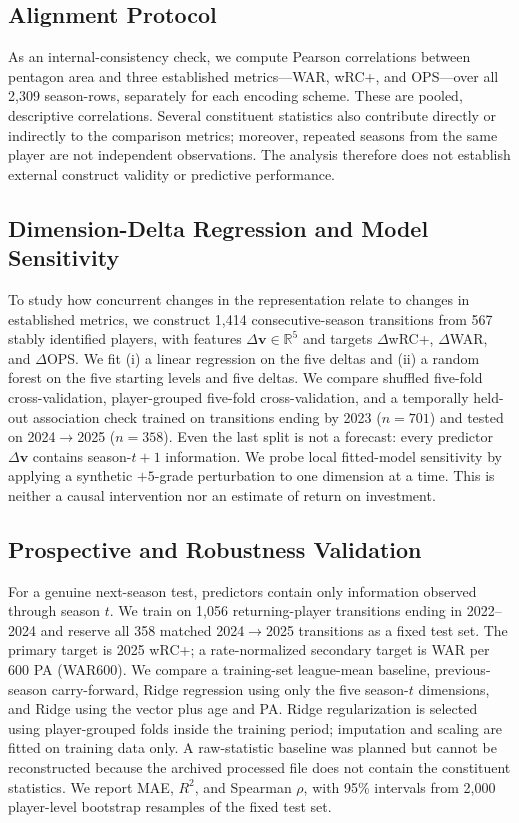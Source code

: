 \documentclass[10pt,twocolumn,letterpaper]{article}
\begin{document}
\subsection{Alignment Protocol}
As an internal-consistency check, we compute Pearson correlations between pentagon area and three established metrics---WAR, wRC+, and OPS---over all 2{,}309 season-rows, separately for each encoding scheme. These are pooled, descriptive correlations. Several constituent statistics also contribute directly or indirectly to the comparison metrics; moreover, repeated seasons from the same player are not independent observations. The analysis therefore does not establish external construct validity or predictive performance.

\subsection{Dimension-Delta Regression and Model Sensitivity}
\label{sec:roi-method}
To study how concurrent changes in the representation relate to changes in established metrics, we construct 1{,}414 consecutive-season transitions from 567 stably identified players, with features $\Delta\mathbf{v} \in \mathbb{R}^5$ and targets $\Delta$wRC+, $\Delta$WAR, and $\Delta$OPS. We fit (i) a linear regression on the five deltas and (ii) a random forest on the five starting levels and five deltas. We compare shuffled five-fold cross-validation, player-grouped five-fold cross-validation, and a temporally held-out association check trained on transitions ending by 2023 ($n=701$) and tested on 2024$\to$2025 ($n=358$). Even the last split is not a forecast: every predictor $\Delta\mathbf{v}$ contains season-$t+1$ information. We probe local fitted-model sensitivity by applying a synthetic $+5$-grade perturbation to one dimension at a time. This is neither a causal intervention nor an estimate of return on investment.

\subsection{Prospective and Robustness Validation}
\label{sec:validation-method}
For a genuine next-season test, predictors contain only information observed through season $t$. We train on 1{,}056 returning-player transitions ending in 2022--2024 and reserve all 358 matched 2024$\to$2025 transitions as a fixed test set. The primary target is 2025 wRC+; a rate-normalized secondary target is WAR per 600 PA (WAR600). We compare a training-set league-mean baseline, previous-season carry-forward, Ridge regression using only the five season-$t$ dimensions, and Ridge using the vector plus age and PA. Ridge regularization is selected using player-grouped folds inside the training period; imputation and scaling are fitted on training data only. A raw-statistic baseline was planned but cannot be reconstructed because the archived processed file does not contain the constituent statistics. We report MAE, $R^2$, and Spearman $\rho$, with 95\% intervals from 2{,}000 player-level bootstrap resamples of the fixed test set.
\end{document}
